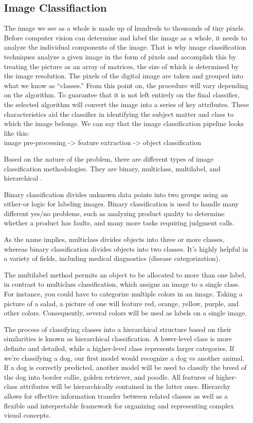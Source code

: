 \subsection{Image Classifiaction}
The image we see as a whole is made up of hundreds to thousands of tiny pixels. Before computer vision can determine and label the image as a whole, it needs to analyze the individual components of the image. That is why image classification techniques analyze a given image in the form of pixels and accomplish this by treating the picture as an array of matrices, the size of which is determined by the image resolution. The pixels of the digital image are taken and grouped into what we know as “classes.” From this point on, the procedure will vary depending on the algorithm. To guarantee that it is not left entirely on the final classifier, the selected algorithm will convert the image into a series of key attributes. These characteristics aid the classifier in identifying the subject matter and class to which the image belongs.
We can say that the image classification pipeline looks like this:\\
image pre-processing -> feature extraction -> object classification


Based on the nature of the problem, there are different types of image classification methodologies. They are binary, multiclass, multilabel, and hierarchical \cite{CERRI201439}.

Binary classification divides unknown data points into two groups using an either-or logic for labeling images. Binary classification is used to handle many different yes/no problems, such as analyzing product quality to determine whether a product has faults, and many more tasks requiring judgment calls.

As the name implies, multiclass divides objects into three or more classes, whereas binary classification divides objects into two classes. It's highly helpful in a variety of fields, including medical diagnostics (disease categorization).

The multilabel method permits an object to be allocated to more than one label, in contrast to multiclass classification, which assigns an image to a single class. For instance, you could have to categorize multiple colors in an image. Taking a picture of a salad, a picture of one will feature red, orange, yellow, purple, and other colors. Consequently, several colors will be used as labels on a single image.

The process of classifying classes into a hierarchical structure based on their similarities is known as hierarchical classification. A lower-level class is more definite and detailed, while a higher-level class represents larger categories. If we're classifying a dog, our first model would recognize a dog vs another animal. If a dog is correctly predicted, another model will be used to classify the breed of the dog into border collie, golden retriever, and poodle. All features of higher-class attributes will be hierarchically contained in the latter ones. Hierarchy allows for effective information transfer between related classes as well as a flexible and interpretable framework for organizing and representing complex visual concepts.


